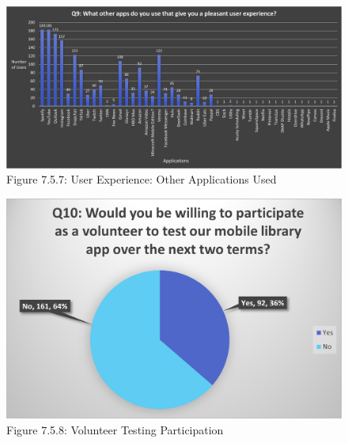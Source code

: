      \begin{figure}[H]
        \hspace*{-2cm}
        \includegraphics[scale = .64]{assets/img/Student Survey Results Q9.png}
         \caption*{Figure 7.5.7: User Experience: Other Applications Used}
    \end{figure}
       \newpage
     \begin{figure}[H]
        \centering
        \includegraphics[width = \textwidth, height = \textheight, keepaspectratio]{assets/img/Student Survey Results Q10.png}
        \caption*{Figure 7.5.8: Volunteer Testing Participation}
    \end{figure}
